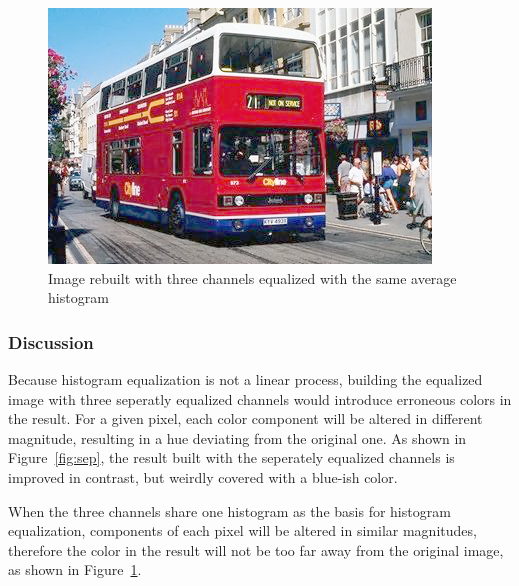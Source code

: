 \documentclass{article}
\begin{document}
\begin{figure}[H]
	\centering
	\includegraphics[width=288pt]{../result/hist/hist-together.png}
	\caption{Image rebuilt with three channels equalized with the same average histogram}
	\label{fig:tog}
\end{figure}

\subsubsection{Discussion}

Because histogram equalization is not a linear process, building the equalized image with three seperatly equalized channels would introduce erroneous colors in the result. For a given pixel, each color component will be altered in different magnitude, resulting in a hue deviating from the original one.  As shown in Figure~\ref{fig:sep}, the result built with the seperately equalized channels is improved in contrast, but weirdly covered with a blue-ish color.

When the three channels share one histogram as the basis for histogram equalization, components of each pixel will be altered in similar magnitudes, therefore the color in the result will not be too far away from the original image, as shown in Figure~\ref{fig:tog}.
\end{document}
